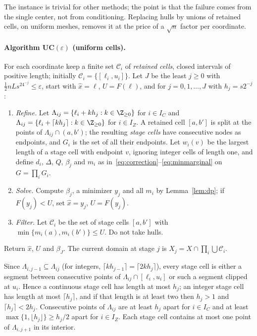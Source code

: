 The instance is trivial for other methods; the point is that the failure
comes from the single center, not from conditioning. Replacing hulls by
unions of retained cells, on uniform meshes, removes it at the price of a
$\sqrt n$ factor per coordinate.

\paragraph{Algorithm UC$(\varepsilon)$ (uniform cells).}
For each coordinate keep a finite set $\mathcal C_i$ of \emph{retained cells},
closed intervals of positive length; initially $\mathcal C_i=\{[\ell_i,u_i]\}$.
Let $J$ be the least $j\ge0$ with $\frac12nLs^24^{-j}\le\varepsilon$, start
with $\hat x=\ell$, $U=F(\ell)$, and for $j=0,1,\dots,J$ with $h_j=s2^{-j}$:
\begin{enumerate}[label=(\roman*)]
\item \emph{Refine.} Let $\Lambda_{ij}=\{\ell_i+kh_j:k\in\Z_{\ge0}\}$ for
$i\in I_C$ and $\Lambda_{ij}=\{\ell_i+\lceil kh_j\rceil:k\in\Z_{\ge0}\}$ for
$i\in I_Z$. A retained cell $[a,b']$ is split at the points of
$\Lambda_{ij}\cap(a,b')$; the resulting \emph{stage cells} have consecutive
nodes as endpoints, and $G_i$ is the set of all their endpoints. Let
$w_i(v)$ be the largest length of a stage cell with endpoint $v$, ignoring
integer cells of length one, and define $d_i$, $\Delta$, $Q$, $\beta_j$ and $m_i$
as in~\eqref{eq:correction}--\eqref{eq:minmarginal} on $G=\prod_iG_i$.
\item \emph{Solve.} Compute $\beta_j$, a minimizer $y_j$ and all $m_i$ by
Lemma~\ref{lem:dp}; if $F(y_j)<U$, set $\hat x=y_j$, $U=F(y_j)$.
\item \emph{Filter.} Let $\mathcal C_i$ be the set of stage cells $[a,b']$
with $\min\{m_i(a),m_i(b')\}\le U$. Do not take hulls.
\end{enumerate}
Return $\hat x$, $U$ and $\beta_J$. The current domain at stage $j$ is
$X_j=X\cap\prod_i\bigcup\mathcal C_i$.

Since $\Lambda_{i,j-1}\subseteq\Lambda_{ij}$ (for integers,
$\lceil kh_{j-1}\rceil=\lceil 2kh_j\rceil$), every stage cell is either a
segment between consecutive points of $\Lambda_{ij}\cap[\ell_i,u_i]$ or such
a segment clipped at $u_i$. Hence a continuous stage cell has length at most
$h_j$; an integer stage cell has length at most $\lceil h_j\rceil$, and if
that length is at least two then $h_j>1$ and $\lceil h_j\rceil<2h_j$.
Consecutive points of $\Lambda_{ij}$ are at least $h_j$ apart for $i\in I_C$
and at least $\max\{1,\lfloor h_j\rfloor\}\ge h_j/2$ apart for $i\in I_Z$.
Each stage cell contains at most one point of $\Lambda_{i,j+1}$ in its
interior.


